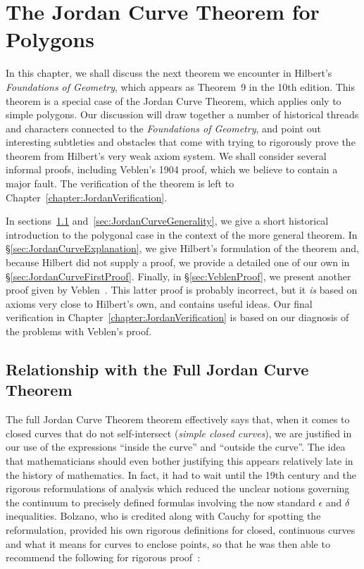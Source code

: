 \chapter{The Jordan Curve Theorem for Polygons}\label{chapter:JordanInformal}
In this chapter, we shall discuss the next theorem we encounter in Hilbert's \emph{Foundations of Geometry}, which appears as Theorem~9 in the 10th edition. This theorem is a special case of the Jordan Curve Theorem, which applies only to simple polygons. Our discussion will draw together a number of historical threads and characters connected to the \emph{Foundations of Geometry}, and point out interesting subtleties and obstacles that come with trying to rigorously prove the theorem from Hilbert's very weak axiom system. We shall consider several informal proofs, including Veblen's 1904 proof, which we believe to contain a major fault. The verification of the theorem is left to Chapter~\ref{chapter:JordanVerification}.

In sections~\ref{sec:JordanCurveHistory} and~\ref{sec:JordanCurveGenerality}, we give a short historical introduction to the polygonal case in the context of the more general theorem. In \S\ref{sec:JordanCurveExplanation}, we give Hilbert's formulation of the theorem and, because Hilbert did not supply a proof, we provide a detailed one of our own in \S\ref{sec:JordanCurveFirstProof}. Finally, in \S\ref{sec:VeblenProof}, we present another proof given by Veblen~\cite{Veblenphd}. This latter proof is probably incorrect, but it \emph{is} based on axioms very close to Hilbert's own, and contains useful ideas. Our final verification in Chapter~\ref{chapter:JordanVerification} is based on our diagnosis of the problems with Veblen's proof.

\section{Relationship with the Full Jordan Curve Theorem}\label{sec:JordanCurveHistory}
The full Jordan Curve Theorem theorem effectively says that, when it comes to closed curves that do not self-intersect (\emph{simple closed curves}), we are justified in our use of the expressions ``inside the curve'' and ``outside the curve''. The idea that mathematicians should even bother justifying this appears relatively late in the history of mathematics. In fact, it had to wait until the 19th century and the rigorous reformulations of analysis which reduced the unclear notions governing the continuum to precisely defined formulas involving the now standard $\epsilon$ and $\delta$ inequalities. Bolzano, who is credited along with Cauchy for spotting the reformulation, provided his own rigorous definitions for closed, continuous curves and what it means for curves to enclose points, so that he was then able to recommend the following for rigorous proof~\cite{BolzanoJordan}:

